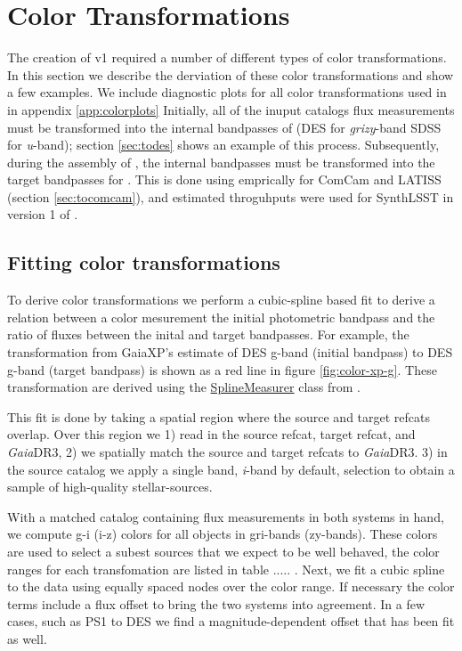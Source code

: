 \section{Color Transformations}
\label{sec:colors}
The creation of \monster v1 required a number of different types of color transformations. 
In this section we describe the derviation of these color transformations and show a few examples. 
We include diagnostic plots for all color transformations used in \monster in appendix \ref{app:colorplots}
Initially, all of the inuput catalogs flux measurements must be transformed into the internal bandpasses of \monster (DES for \emph{grizy}-band SDSS for \emph{u}-band); section \ref{sec:todes} shows an example of this process. 
Subsequently, during the assembly of \monster, the internal bandpasses must be transformed into the target bandpasses for \monster. 
This is done using emprically for ComCam and LATISS (section \ref{sec:tocomcam}), and estimated throguhputs were used for SynthLSST in version 1 of \monster. 


\subsection{Fitting color transformations}
To derive color transformations we perform a cubic-spline based fit to derive a relation between a color mesurement the initial photometric bandpass and the ratio of fluxes between the inital and target bandpasses.
For example, the transformation from GaiaXP's estimate of DES g-band (initial bandpass) to DES g-band (target bandpass) is shown as a red line in figure \ref{fig:color-xp-g}. 
These transformation are derived using the \href{https://github.com/lsst-dm/the_monster/blob/main/python/lsst/the/monster/measure_colorterms.py}{SplineMeasurer} class from \monster. 

This fit is done by taking a spatial region where the source and target refcats overlap. 
Over this region we 1) read in the source refcat, target refcat, and \emph{Gaia}DR3, 2) we spatially match the source and target refcats to \emph{Gaia}DR3. 3) in the source catalog we apply a single band, \textit{i}-band by default, selection to obtain a sample of high-quality stellar-sources.  

With a matched catalog containing flux measurements in both systems in hand, we compute g-i (i-z) colors for all objects in gri-bands (zy-bands). 
These colors are used to select a subest sources that we expect to be well behaved, the color ranges for each transfomation are listed in table ..... .
Next, we fit a cubic spline to the data using equally spaced nodes over the color range.
If necessary the color terms include a flux offset to bring the two systems into agreement. 
In a few cases, such as PS1 to DES we find a magnitude-dependent offset that has been fit as well.

